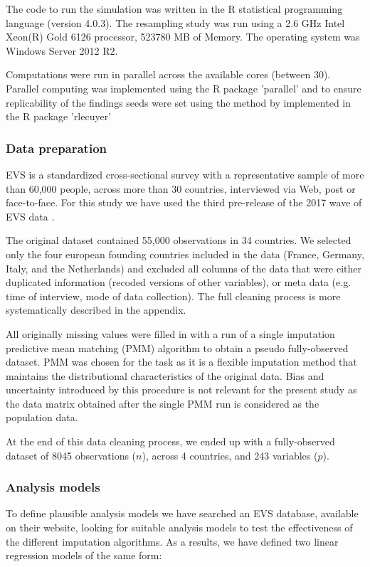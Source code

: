 	The code to run the simulation was written in the R statistical programming language (version 4.0.3). 
	The resampling study was run using a 2.6 GHz Intel Xeon(R) Gold 6126 processor, 523780 MB of Memory. The
	operating system was Windows Server 2012 R2.

	Computations were run in parallel across the available cores (between 30). Parallel computing 
	was implemented using the R package 'parallel' and to ensure replicability of the findings seeds were
	set using the method by \cite{lecuyer:2002} implemented in the R package 'rlecuyer'

\subsubsection{Data preparation}
	EVS is a standardized cross-sectional survey with a representative sample of more than 60,000 
	people, across more than 30 countries, interviewed via Web, post or face-to-face.
	For this study we have used the third pre-release of the 2017 wave of EVS data \citep{EVS:2017}.

	The original dataset contained 55,000 observations in 34 countries.
	We selected only the four european founding countries included in the data (France, Germany,
	Italy, and the Netherlands) and excluded all columns of the data that were either duplicated
	information (recoded versions of other variables), or meta data (e.g. time of interview,
	mode of data collection). 
	The full cleaning process is more systematically described in the appendix.

	All originally missing values were filled in with a run of a single imputation predictive mean matching (PMM) 
	algorithm to obtain a pseudo fully-observed dataset.
	PMM was chosen for the task as it is a flexible imputation method that maintains the distributional 
	characteristics of the original data.
	Bias and uncertainty introduced by this procedure is not relevant for the present study as the data matrix
	obtained after the single PMM run is considered as the population data.
	
	At the end of this data cleaning process, we ended up with a fully-observed dataset
	of 8045 observations ($n$), across 4 countries, and 243 variables ($p$).

\subsubsection{Analysis models}

	To define plausible analysis models we have searched an EVS database, available on their website, 
	looking for suitable analysis models to test the effectiveness of the different imputation algorithms.
	As a results, we have defined two linear regression models of the same form:
	
